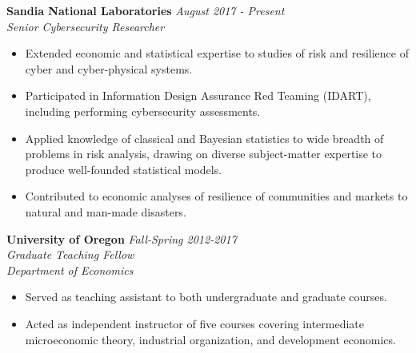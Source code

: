 \documentclass[11pt]{article}
\newenvironment{changemargin}[2]{%
  \begin{list}{}{%
    \setlength{\topsep}{0pt}%
    \setlength{\leftmargin}{#1}%
    \setlength{\rightmargin}{#2}%
    \setlength{\listparindent}{\parindent}%
    \setlength{\itemindent}{\parindent}%
    \setlength{\parsep}{\parskip}%
  }%
  \item[]}{\end{list}
}
\newenvironment{body} {
	\vspace*{-16pt}
	\begin{changemargin}{-0.25in}{-0.5in}
  }	
	{\end{changemargin}
}
\begin{document}
\begin{body}
	\vspace{14pt}
	
	\textbf{Sandia National Laboratories} \hfill \emph{August 2017 - Present}\\
	\emph{Senior Cybersecurity Researcher}\\
	\vspace*{-4pt}
	\begin{itemize}
		\item Extended economic and statistical expertise to studies of risk and resilience of cyber and cyber-physical systems.
		\item Participated in Information Design Assurance Red Teaming (IDART), including performing cybersecurity assessments.
		\item Applied knowledge of classical and Bayesian statistics to wide breadth of problems in risk analysis, drawing on diverse subject-matter expertise to produce well-founded statistical models.
		\item Contributed to economic analyses of resilience of communities and markets to natural and man-made disasters.
	\end{itemize}	
	
	
	\textbf{University of Oregon} \hfill \emph{Fall-Spring 2012-2017}\\
	\emph{Graduate Teaching Fellow}\\
	\emph{Department of Economics}
	\vspace*{-4pt}
	\begin{itemize}
		\item Served as teaching assistant to both undergraduate and graduate courses.
		\item Acted as independent instructor of five courses covering intermediate microeconomic theory, industrial organization, and development economics.
	\end{itemize}	
	


\end{body}
\end{document}
